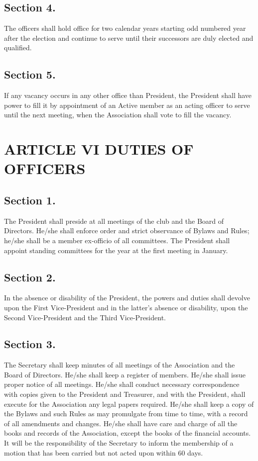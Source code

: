 \documentclass[12pt,letterpaper]{article}
\begin{document}
\subsection*{Section 4.} The officers shall hold office for two calendar years starting odd numbered
year after the election and continue to serve until their successors are duly elected and
qualified.
\subsection*{Section 5.} If any vacancy occurs in any other office than President, the President shall
have power to fill it by appointment of an Active member as an acting officer to serve
until the next meeting, when the Association shall vote to fill the vacancy.

\section*{ARTICLE VI
DUTIES OF OFFICERS}

\subsection*{Section 1.} The President shall preside at all meetings of the club and the Board of
Directors. He/she shall enforce order and strict observance of Bylaws and Rules; he/she
shall be a member ex-officio of all committees. The President shall appoint standing
committees for the year at the first meeting in January.
\subsection*{Section 2.} In the absence or disability of the President, the powers and duties shall
devolve upon the First Vice-President and in the latter’s absence or disability, upon the
Second Vice-President and the Third Vice-President.
\subsection*{Section 3.} The Secretary shall keep minutes of all meetings of the Association and the
Board of Directors. He/she shall keep a register of members. He/she shall issue proper
notice of all meetings. He/she shall conduct necessary correspondence with copies
given to the President and Treasurer, and with the President, shall execute for the
Association any legal papers required. He/she shall keep a copy of the Bylaws and such
Rules as may promulgate from time to time, with a record of all amendments and
changes. He/she shall have care and charge of all the books and records of the
Association, except the books of the financial accounts. It will be the responsibility of
the Secretary to inform the membership of a motion that has been carried but not acted
upon within 60 days.
\end{document}
